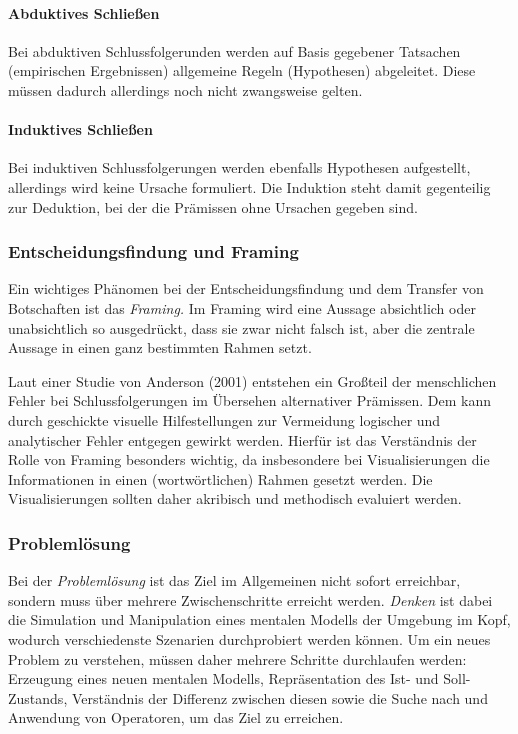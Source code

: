 \paragraph{Abduktives Schließen}
	Bei abduktiven Schlussfolgerunden werden auf Basis gegebener Tatsachen (empirischen Ergebnissen) allgemeine Regeln (Hypothesen) abgeleitet. Diese müssen dadurch allerdings noch nicht zwangsweise gelten.

	\paragraph{Induktives Schließen}
		Bei induktiven Schlussfolgerungen werden ebenfalls Hypothesen aufgestellt, allerdings wird keine Ursache formuliert. Die Induktion steht damit gegenteilig zur Deduktion, bei der die Prämissen ohne Ursachen gegeben sind.

		\subsubsection{Entscheidungsfindung und Framing}
			Ein wichtiges Phänomen bei der Entscheidungsfindung und dem Transfer von Botschaften ist das \emph{Framing.} Im Framing wird eine Aussage absichtlich oder unabsichtlich so ausgedrückt, dass sie zwar nicht falsch ist, aber die zentrale Aussage in einen ganz bestimmten Rahmen setzt.

			Laut einer Studie von Anderson (2001) entstehen ein Großteil der menschlichen Fehler bei Schlussfolgerungen im Übersehen alternativer Prämissen. Dem kann durch geschickte visuelle Hilfestellungen zur Vermeidung logischer und analytischer Fehler entgegen gewirkt werden. Hierfür ist das Verständnis der Rolle von Framing besonders wichtig, da insbesondere bei Visualisierungen die Informationen in einen (wortwörtlichen) Rahmen gesetzt werden. Die Visualisierungen sollten daher akribisch und methodisch evaluiert werden.

		\subsubsection{Problemlösung}
			Bei der \emph{Problemlösung} ist das Ziel im Allgemeinen nicht sofort erreichbar, sondern muss über mehrere Zwischenschritte erreicht werden. \emph{Denken} ist dabei die Simulation und Manipulation eines mentalen Modells der Umgebung im Kopf, wodurch verschiedenste Szenarien durchprobiert werden können. Um ein neues Problem zu verstehen, müssen daher mehrere Schritte durchlaufen werden: Erzeugung eines neuen mentalen Modells, Repräsentation des Ist- und Soll-Zustands, Verständnis der Differenz zwischen diesen sowie die Suche nach und Anwendung von Operatoren, um das Ziel zu erreichen.

